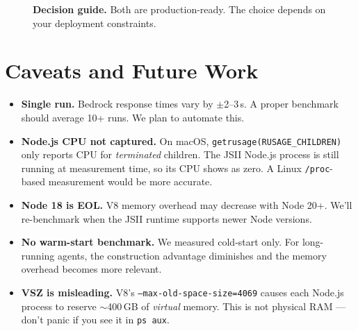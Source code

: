 \documentclass[11pt]{article}
\begin{document}
\begin{figure}[H]
\centering
{}
\caption{\textbf{Decision guide.} Both are production-ready. The choice depends on your deployment constraints.}
\label{fig:decision}
\end{figure}

\section{Caveats and Future Work}

\begin{itemize}[leftmargin=1.5em, itemsep=0.2em]
  \item \textbf{Single run.} Bedrock response times vary by $\pm$2--3\,s. A proper benchmark should average 10+ runs. We plan to automate this.

  \item \textbf{Node.js CPU not captured.} On macOS, \texttt{getrusage(RUSAGE\_CHILDREN)} only reports CPU for \textit{terminated} children. The JSII Node.js process is still running at measurement time, so its CPU shows as zero. A Linux \texttt{/proc}-based measurement would be more accurate.

  \item \textbf{Node 18 is EOL.} V8 memory overhead may decrease with Node 20+. We'll re-benchmark when the JSII runtime supports newer Node versions.

  \item \textbf{No warm-start benchmark.} We measured cold-start only. For long-running agents, the construction advantage diminishes and the memory overhead becomes more relevant.

  \item \textbf{VSZ is misleading.} V8's \texttt{--max-old-space-size=4069} causes each Node.js process to reserve $\sim$400\,GB of \textit{virtual} memory. This is not physical RAM — don't panic if you see it in \texttt{ps aux}.
\end{itemize}
\end{document}
